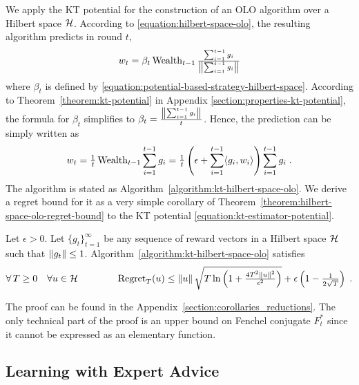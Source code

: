 We apply the KT potential for the construction of an OLO algorithm over a Hilbert
space $\mathcal{H}$. According to \eqref{equation:hilbert-space-olo}, the resulting algorithm predicts
in round $t$,
\[
w_t = \beta_t \operatorname{Wealth}_{t-1} \tfrac{\sum_{i=1}^{t-1} g_i}{\left\|{\sum_{i=1}^{t-1} g_i}\right\|}
\]
where $\beta_t$ is defined by
\eqref{equation:potential-based-strategy-hilbert-space}. According to
Theorem~\ref{theorem:kt-potential} in Appendix
\ref{section:properties-kt-potential}, the formula for $\beta_t$ simplifies to
$\beta_t = \frac{\left\|{\sum_{i=1}^{t-1} g_i}\right\|}{t}$. Hence, the prediction can be
simply written as
\[
w_t
= \tfrac{1}{t} \operatorname{Wealth}_{t-1} \sum_{i=1}^{t-1} g_i
= \tfrac{1}{t} \left(\epsilon + \sum_{i=1}^{t-1} \langle g_i, w_i \rangle \right) \sum_{i=1}^{t-1} g_i \; .
\]
The algorithm is stated as Algorithm~\ref{algorithm:kt-hilbert-space-olo}.
We derive a regret bound for it as a very simple corollary of Theorem~\ref{theorem:hilbert-space-olo-regret-bound} to the KT
potential \eqref{equation:kt-estimator-potential}. 
\begin{corollary}
\label{corollary:kt-hilbert-space-olo-regret}
Let $\epsilon > 0$. Let $\{g_t\}_{t=1}^\infty$ be any sequence of reward vectors
in a Hilbert space $\mathcal{H}$ such that $\left\|{g_t}\right\| \le 1$.
Algorithm~\ref{algorithm:kt-hilbert-space-olo} satisfies
\[
\forall \, T \ge 0 \quad
\forall u \in \mathcal{H} \qquad \qquad
\operatorname{Regret}_T(u) \le \left\|{u}\right\| \sqrt{T \ln\left(1 + \tfrac{4T^2 \left\|{u}\right\|^2}{\epsilon^2} \right)} + \epsilon \left(1 - \tfrac{1}{2\sqrt{T}} \right) \;.
\]
\end{corollary}
The proof can be found in the Appendix~\ref{section:corollaries_reductions}. The only technical
part of the proof is an upper bound on Fenchel conjugate $F_t^*$ since it cannot
be expressed as an elementary function.

\subsection{Learning with Expert Advice}
\label{sec:kt-lea}

